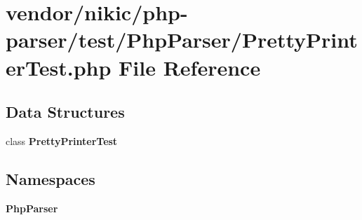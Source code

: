 \section{vendor/nikic/php-\/parser/test/\+Php\+Parser/\+Pretty\+Printer\+Test.php File Reference}
\label{_pretty_printer_test_8php}
\subsection*{Data Structures}
\begin{DoxyCompactItemize}
\item 
class {\bf Pretty\+Printer\+Test}
\end{DoxyCompactItemize}
\subsection*{Namespaces}
\begin{DoxyCompactItemize}
\item 
 {\bf Php\+Parser}
\end{DoxyCompactItemize}
